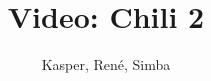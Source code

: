 \documentclass[a4paper,11pt]{article}
\title{Video: Chili 2}
\author{Kasper, René, Simba}
\begin{document}
\maketitle

\begin{sketch}


\end{sketch}
\end{document}
